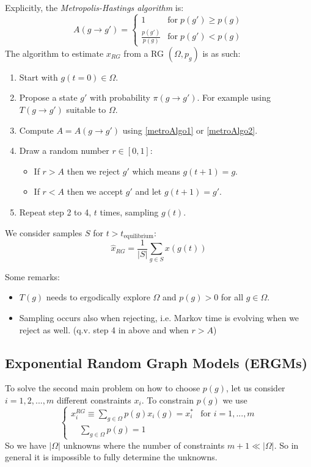 \documentclass[12pt]{article}
\theoremstyle{definition}
\begin{document}
Explicitly, the \textit{Metropolis-Hastings algorithm} is:
\begin{equation}\label{metroAlgo2}
A(g\to g') = 
    \begin{cases}
        1 & \mathrm{for}\;p(g')\geq p(g)\\
        \frac{p(g')}{p(g)} & \mathrm{for}\;p(g')< p(g)
    \end{cases}
\end{equation}
The algorithm to estimate $x_{RG}$ from a RG $(\Omega,p_g)$ is as such: 
\begin{enumerate}
    \item Start with $g(t=0)\in \Omega$.
    \item Propose a state $g'$ with probability $\pi(g\to g')$. For example using $T(g\to g')$ suitable to $\Omega$.
    \item Compute $A=A(g\to g')$ using \cref{metroAlgo1} or \cref{metroAlgo2}. 
    \item Draw a random number $r\in [0,1]$: 
    \begin{itemize}
        \item If $r>A$ then we reject $g'$ which means $g(t+1)= g$. 
        \item If $r<A$ then we accept $g'$ and let $g(t+1)=g'$. 
    \end{itemize}
    \item Repeat step 2 to 4, $t$ times, sampling $g(t)$. 
\end{enumerate}
We consider samples $S$ for $t>t_{\text{equilibrium}}$: 
\[ \hat x_{RG} = \frac 1 {|S|} \sum_{g\in S} x(g(t))\]

Some remarks:
    \begin{itemize}
        \item $T(g)$ needs to ergodically explore $\Omega$ and $p(g)>0$ for all $g\in \Omega$. 
        \item Sampling occurs also when rejecting, i.e. Markov time is evolving when we reject as well. (q.v. step 4 in above and when $r>A$)
    \end{itemize}

\subsection{Exponential Random Graph Models (ERGMs)}

To solve the second main problem on how to choose $p(g)$, let us consider $i=1,2,...,m$ different constraints $x_i$. To constrain $p(g)$ we use
\[
\begin{cases}
    x_i^{RG} \equiv \sum_{g\in \Omega} p(g)x_i(g) = x_i^* & \text{for }i=1,...,m \\
    \quad \sum_{g\in \Omega} p(g) = 1 
\end{cases}
\]
So we have $|\Omega|$ unknowns where the number of constraints $m+1 \ll |\Omega|$. So in general it is impossible to fully determine the unknowns. 
\end{document}

